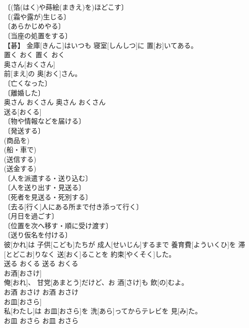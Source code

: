 \documentclass[8pt]{extreport}
\begin{document}
\begin{CJK}{UTF8}{min}
\\	[⇒あつかう 
\\	〔隔てる〕 (空間を) 
\\	(時間を) 
\\	[⇒-おき] 
\\	〔(箔(はく)や蒔絵(まきえ)を)ほどこす〕 
\\	〔(霜や露が)生じる〕 
\\	〔あらかじめやる〕 
\\	〔当座の処置をする〕 
\\	【碁】	金庫[きんこ]はいつも 寝室[しんしつ]に 置[お]いてある。	
\\	置く	おく	置く	おく	
\\	奥さん[おくさん]	
\\	[⇒おくさま]	前[まえ]の 奥[おく]さん。	
\\	〔亡くなった〕 
\\	〔離婚した〕 
\\	奥さん	おくさん	奥さん	おくさん	
\\	送る[おくる]	
\\	〔物や情報などを届ける〕 
\\	〔発送する〕 
\\	(商品を) 
\\	(船・車で) 
\\	(送信する) 
\\	(送金する) 
\\	〔人を派遣する・送り込む〕 
\\	〔人を送り出す・見送る〕 
\\	〔死者を見送る・死別する〕 
\\	〔去る[行く]人にある所まで付き添って行く〕 
\\	〔月日を過ごす〕 
\\	〔位置を次へ移す・順に受け渡す〕 
\\	〔送り仮名を付ける〕 
\\	彼[かれ]は 子供[こども]たちが 成人[せいじん]するまで 養育費[よういくひ]を 滞[とどこお]りなく 送[おく]ることを 約束[やくそく]した。	
\\	送る	おくる	送る	おくる	
\\	お酒[おさけ]	
\\	俺[おれ]、 甘党[あまとう]だけど、お 酒[さけ]も 飲[の]むよ。	
\\	お酒	おさけ	お酒	おさけ	
\\	お皿[おさら]	
\\	私[わたし]は お皿[おさら]を 洗[あら]ってからテレビを 見[み]た。	
\\	お皿	おさら	お皿	おさら	

\end{CJK}
\end{document}

